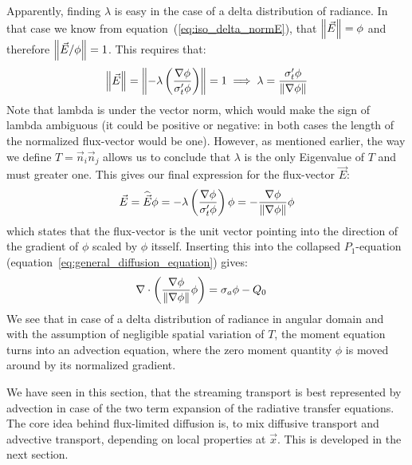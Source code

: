 Apparently, finding $\lambda$ is easy in the case of a delta distribution of radiance. In that case we know from equation~(\ref{eq:iso_delta_normE}), that $\left\lVert\vec{E}\right\rVert=\phi$ and therefore $\left\lVert\vec{E}/\phi\right\rVert=1$. This requires that:
\begin{align*}
\left\lVert\vec{E}\right\rVert
=
\left\lVert-\lambda\left(\frac{\nabla\phi}{\sigma_t'\phi}\right )\right\rVert=1
\implies
\lambda=\frac{\sigma_t'\phi}{\left\lVert\nabla\phi\right\rVert}
\end{align*}
Note that lambda is under the vector norm, which would make the sign of lambda ambiguous (it could be positive or negative: in both cases the length of the normalized flux-vector would be one). However, as mentioned earlier, the way we define $T=\vec{n}_i\vec{n}_j$ allows us to conclude that $\lambda$ is the only Eigenvalue of $T$ and must greater one. This gives our final expression for the flux-vector $\vec{E}$:
\begin{align*}
\vec{E}=\widehat{\vec{E}}\phi= -\lambda\left(\frac{\nabla\phi}{\sigma_t'\phi}\right )\phi= -\frac{\nabla\phi}{\left\lVert\nabla\phi\right\rVert}\phi
\end{align*}
which states that the flux-vector is the unit vector pointing into the direction of the gradient of $\phi$ scaled by $\phi$ itsself. Inserting this into the collapsed $P_1$-equation (equation~\ref{eq:general_diffusion_equation}) gives:
\begin{align}
\label{eq:iso_delta_advection_equation}
\nabla\cdot\left(\frac{\nabla\phi}{\left\lVert\nabla\phi\right\rVert}\phi\right) &= \sigma_a\phi - Q_0
\end{align}
We see that in case of a delta distribution of radiance in angular domain and with the assumption of negligible spatial variation of $T$, the moment equation turns into an advection equation, where the zero moment quantity $\phi$ is moved around by its normalized gradient.

We have seen in this section, that the streaming transport is best represented by advection in case of the two term expansion of the radiative transfer equations. The core idea behind flux-limited diffusion is, to mix diffusive transport and advective transport, depending on local properties at $\vec{x}$. This is developed in the next section.